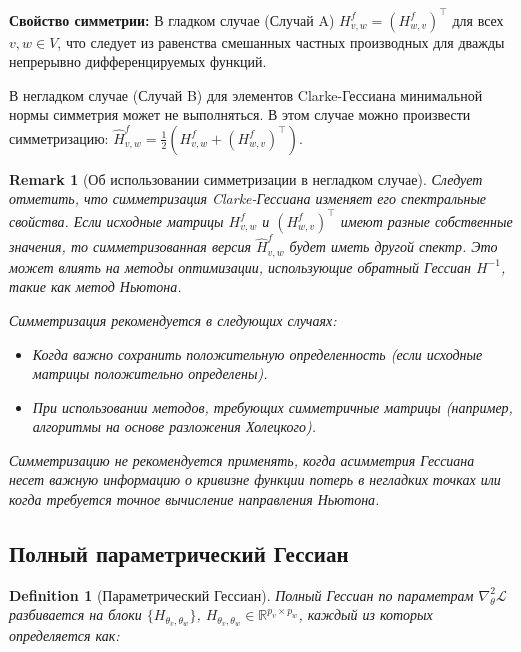 \documentclass[11pt]{article}
\newtheorem{remark}{Remark}
\newtheorem{definition}{Definition}
\begin{document}
\textbf{Свойство симметрии:} В гладком случае (Случай A) $H^f_{v,w}=(H^f_{w,v})^\top$ для всех $v,w \in V$,
что следует из равенства смешанных частных производных для дважды непрерывно дифференцируемых функций.

В негладком случае (Случай B) для элементов Clarke-Гессиана минимальной нормы симметрия может не выполняться.
В этом случае можно произвести симметризацию: $\hat{H}^f_{v,w} = \frac{1}{2}(H^f_{v,w} + (H^f_{w,v})^\top)$.

\begin{remark}[Об использовании симметризации в негладком случае]
  Следует отметить, что симметризация Clarke-Гессиана изменяет его спектральные свойства. Если исходные
  матрицы $H^f_{v,w}$ и $(H^f_{w,v})^\top$ имеют разные собственные значения, то симметризованная версия
  $\hat{H}^f_{v,w}$ будет иметь другой спектр. Это может влиять на методы оптимизации, использующие обратный
  Гессиан $H^{-1}$, такие как метод Ньютона.

  Симметризация рекомендуется в следующих случаях:
  \begin{itemize}
    \item Когда важно сохранить положительную определенность (если исходные матрицы положительно определены).
    \item При использовании методов, требующих симметричные матрицы (например, алгоритмы на основе разложения
      Холецкого).
  \end{itemize}

  Симметризацию не рекомендуется применять, когда асимметрия Гессиана несет важную информацию о кривизне
  функции потерь в негладких точках или когда требуется точное вычисление направления Ньютона.
\end{remark}

\subsection{Полный параметрический Гессиан}

\begin{definition}[Параметрический Гессиан]
  Полный Гессиан по параметрам $\nabla^2_{\theta}\mathcal L$ разбивается на блоки
  $\{H_{\theta_v,\theta_w}\}$, $H_{\theta_v,\theta_w}\in\mathbb{R}^{p_v\times p_w}$, каждый из которых определяется как:
\end{definition}
\end{document}
